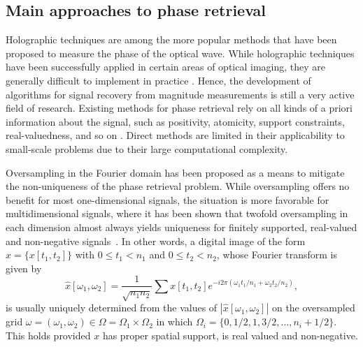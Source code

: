 \documentclass[11pt]{article}
\newcommand{\<}{\langle}
\renewcommand{\>}{\rangle}
\newcommand{\ts}[1]{\textcolor{blue}{#1}}
\numberwithin{equation}{section}
\newcommand{\ejc}[1]{\textcolor{red}{#1}}
\begin{document}
\subsection{Main approaches to phase retrieval}

Holographic techniques are among the more popular methods that have
been proposed to measure the phase of the optical wave. While
holographic techniques have been successfully applied in certain areas
of optical imaging, they are generally difficult to implement in
practice %
\cite{Dua11}.
Hence, the development of algorithms for signal recovery from magnitude
measurements is still a very active field of research.  Existing
methods for phase retrieval rely on all kinds of a priori information
about the signal, such as positivity, atomicity, support constraints,
real-valuedness, and so on \cite{Fie78,Fie82,Mar07,CMW07}.  Direct methods
\cite{Hau86} are limited in their applicability to small-scale
problems due to their large computational complexity. 

Oversampling in the Fourier domain has been proposed as a means to
mitigate the non-uniqueness of the phase retrieval problem. While
oversampling offers no benefit for most one-dimensional signals, the
situation is more favorable for multidimensional signals, where it has
been shown that twofold oversampling in each dimension almost always
yields uniqueness for finitely supported, real-valued and non-negative
signals~\cite{BS79,Hay82,San85}. In other words, a digital image of
the form $x = \{x[t_1, t_2]\}$ with $0 \le t_1 < n_1$ and $0 \le t_2 <
n_2$, whose Fourier transform is given by
\begin{equation}
  \label{eq:Fourier2D}
  {\hat x}[\omega_1,\omega_2] = \frac{1}{\sqrt{n_1 n_2}} \sum x[t_1,
  t_2] e^{-i 2\pi (\omega_1 t_1/n_1 + \omega_2 t_2/n_2)}, 
\end{equation}
is usually uniquely determined from the values of $| {\hat
  x}[\omega_1,\omega_2]|$ on the oversampled grid $\omega = (\omega_1,
\omega_2) \in \Omega = \Omega_1 \times \Omega_2$ in which $\Omega_i =
\{0,1/2,1,3/2,\ldots, n_i + 1/2\}$. This holds provided $x$ has proper
spatial support, is real valued and non-negative.
\end{document}
